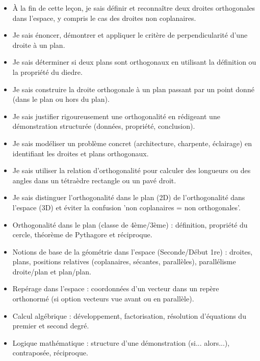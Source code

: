 \documentclass[11pt]{article}
\begin{document}
\begin{objectifs}
\begin{itemize}
\item À la fin de cette leçon, je sais définir et reconnaître deux droites orthogonales dans l'espace, y compris le cas des droites non coplanaires.
\item Je sais énoncer, démontrer et appliquer le critère de perpendicularité d'une droite à un plan.
\item Je sais déterminer si deux plans sont orthogonaux en utilisant la définition ou la propriété du diedre.
\item Je sais construire la droite orthogonale à un plan passant par un point donné (dans le plan ou hors du plan).
\item Je sais justifier rigoureusement une orthogonalité en rédigeant une démonstration structurée (données, propriété, conclusion).
\item Je sais modéliser un problème concret (architecture, charpente, éclairage) en identifiant les droites et plans orthogonaux.
\item Je sais utiliser la relation d'orthogonalité pour calculer des longueurs ou des angles dans un tétraèdre rectangle ou un pavé droit.
\item Je sais distinguer l'orthogonalité dans le plan (2D) de l'orthogonalité dans l'espace (3D) et éviter la confusion 'non coplanaires = non orthogonales'.
\end{itemize}
\end{objectifs}

\begin{prerequis}
\begin{itemize}
\item Orthogonalité dans le plan (classe de 4ème/3ème) : définition, propriété du cercle, théorème de Pythagore et réciproque.
\item Notions de base de la géométrie dans l'espace (Seconde/Début 1re) : droites, plans, positions relatives (coplanaires, sécantes, parallèles), parallélisme droite/plan et plan/plan.
\item Repérage dans l'espace : coordonnées d'un vecteur dans un repère orthonormé (si option vecteurs vue avant ou en parallèle).
\item Calcul algébrique : développement, factorisation, résolution d'équations du premier et second degré.
\item Logique mathématique : structure d'une démonstration (si... alors...), contraposée, réciproque.
\end{itemize}
\end{prerequis}
\end{document}
